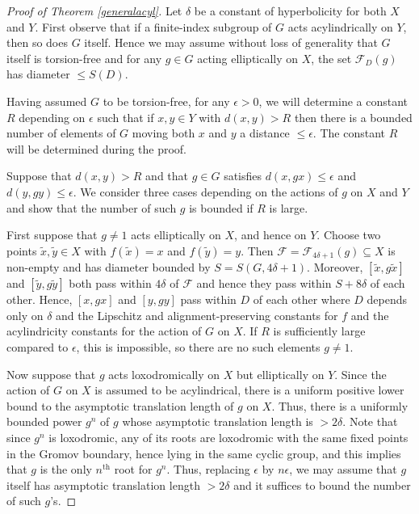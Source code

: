 \documentclass[11pt]{article}
\theoremstyle{remark}
\begin{document}
\begin{proof}[Proof of Theorem \ref{generalacyl}]
  Let $\delta$ be a constant of hyperbolicity for both $X$ and $Y$. First observe that
  if a finite-index subgroup of $G$ acts acylindrically on $Y$,
  then so does $G$ itself. Hence we may assume without loss of generality that $G$
  itself is torsion-free and for any $g\in G$ acting elliptically on $X$, the set
  $\mathcal{F}_D(g)$ has diameter $\leq S(D)$.

  Having assumed $G$ to be torsion-free, for any
  $\epsilon>0$, we will determine a constant $R$ depending on $\epsilon$ such that
  if $x,y\in Y$ with $d(x,y)>R$ then there is a bounded number of elements of $G$ moving
  both $x$ and $y$ a distance $\leq \epsilon$. The constant $R$ will be determined during the proof.

  Suppose that $d(x,y)>R$ and that $g\in G$ satisfies $d(x,gx)\leq
  \epsilon$ and $d(y,gy)\leq
  \epsilon$. We consider
  three cases depending on the actions of $g$ on $X$ and $Y$ and show
  that the number of such $g$ is bounded if $R$ is large.


  First suppose that
  $g\neq 1$ acts elliptically on $X$, and hence on $Y$.
  Choose two points $\widetilde x, \widetilde y \in X$
  with $f(\widetilde x)=x$ and $f(\widetilde y)=y$. Then
  $\mathcal F = \mathcal F_{4\delta+1}(g)\subseteq X$ is non-empty and has diameter bounded
  by $S=S(G,4\delta+1)$. Moreover, $[\widetilde x,g\widetilde x]$ and
  $[\widetilde y,g \widetilde y]$ both pass within $4\delta$ of $\mathcal F$ and
  hence they pass within $S+8\delta$ of each other.
  Hence, $[x,gx]$ and $[y,gy]$
  pass within $D$ of each other where $D$ depends only on $\delta$ and
  the Lipschitz and 
  alignment-preserving constants for $f$ and the acylindricity constants for the action of $G$ on $X$. If $R$ is sufficiently large compared
  to $\epsilon$, this is impossible, so there are no such elements
  $g\neq 1$.


  

  Now suppose that $g$ acts loxodromically on $X$ but elliptically on
  $Y$. Since the action of $G$ on $X$ is assumed to be acylindrical,
  there is a uniform positive lower bound to the asymptotic
  translation length of $g$ on $X$. Thus, there is a uniformly bounded power
  $g^n$ of $g$ whose asymptotic translation length is
  $>2\delta$. Note that since $g^n$ is loxodromic, any of its roots
  are loxodromic with the same fixed points in the Gromov boundary, hence lying in the same
  cyclic group, and this implies that $g$ is the only 
 $n^{\text{th}}$ root for $g^n$. 
  Thus, replacing $\epsilon$ by $n\epsilon$, we may assume that
  $g$ itself has asymptotic translation length $>2\delta$ and it
  suffices to bound the number of such $g$'s.
  

\end{proof}
\end{document}
